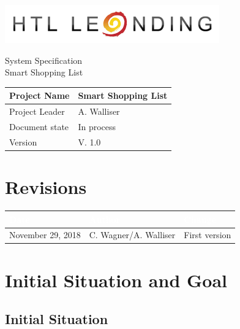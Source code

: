 \documentclass[12pt]{article}
\theoremstyle{definition}
\newcommand{\projectname}{Smart Shopping List}
\newcommand{\productname}{Smart Shopping List}
\newcommand{\projectleader}{A. Walliser}
\newcommand{\documentstatus}{In process}
\newcommand{\version}{V. 1.0}
\begin{document}
\begin{titlepage}
\begin{flushright}
\includegraphics[scale=.5]{Images/htlleondinglogo.png}\\
\end{flushright}

\vspace{10em}

\begin{center}
{\Huge System Specification} \\[3em]
{\LARGE \productname} \\[3em]
\end{center}

\begin{flushleft}
\begin{tabular}{|l|l|}
\hline
Project Name & \projectname \\ \hline
Project Leader & \projectleader \\ \hline
Document state & \documentstatus \\ \hline
Version & \version \\ \hline
\end{tabular}
\end{flushleft}

\end{titlepage}
\section*{Revisions}
\begin{tabular}{|l|l|l|}
\hline
\cellcolor[gray]{0.5}\textcolor{white}{Date} & \cellcolor[gray]{0.5}\textcolor{white}{Author} & \cellcolor[gray]{0.5}\textcolor{white}{Change} \\ \hline
November 29, 2018&C. Wagner/A. Walliser&First version \\ \hline
\end{tabular}
\pagebreak

\tableofcontents
\pagebreak

\section{Initial Situation and Goal}

\subsection{Initial Situation}
\end{document}
